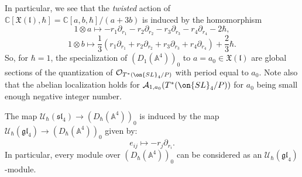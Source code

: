 \documentclass[12pt]{amsart}
\begin{document}
    In particular, we see that the {\emph{twisted}} action of $\mathbb{C}[\mathfrak{X}(\mathfrak{l}),\hbar]=\mathbb{C}[a,b,\hbar]/(a+3b)$ is induced by the homomorphism 
    \begin{equation*}
    1 \otimes a \mapsto -r_1\partial_{r_1}-r_2\partial_{r_2}-r_{3}\partial_{r_3}-r_4\partial_{r_4}-2\hbar,
    \end{equation*}
    \begin{equation*}
    1 \otimes b \mapsto \frac{1}{3}(r_1\partial_{r_1}+r_2\partial_{r_2}+r_3\partial_{r_3}+r_4\partial_{r_4})+\frac{2}{3}\hbar.
    \end{equation*}
    So, for $\hbar=1$, the specialization of $(D_{1}(\mathbb{A}^4))_0$ to $a=a_0 \in \mathfrak{X}(\mathfrak{l})$ are global sections of the quantization of $\mathcal{O}_{T^*(\on{SL}_4/P)}$ with period equal to $a_0$. Note also that the abelian localization holds for $\mathcal{A}_{1,a_0}(T^*(\on{SL}_4/P))$ for $a_0$ being small enough negative integer number. 

    
    
    
    
    The map $\mathcal{U}_{\hbar}(\mathfrak{sl}_4) \rightarrow (D_{\hbar}(\mathbb{A}^4))_0$ is induced by the map $\mathcal{U}_{\hbar}(\mathfrak{gl}_4) \rightarrow (D_{\hbar}(\mathbb{A}^4))_0$ given by:
    \begin{equation*}
    e_{ij} \mapsto -r_j\partial_{r_i}.
    \end{equation*}
    In particular, every module over $(D_{\hbar}(\mathbb{A}^4))_0$ can be considered as an $\mathcal{U}_{\hbar}(\mathfrak{gl}_4)$-module. 
      
\end{document}
